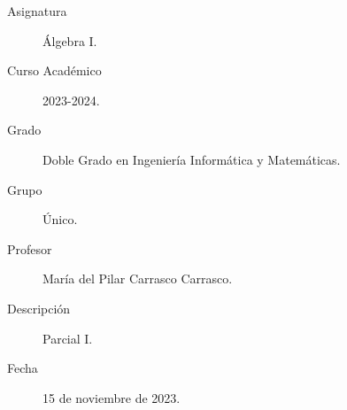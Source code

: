 \documentclass[12pt]{article}
\begin{document}
    \newcommand{\Z}{{\mathbb{Z}}} %
    \newcommand{\Q}{{\mathbb{Q}}} %
    \newcommand{\R}{{\mathbb{R}}} %
    \newcommand{\C}{{\mathbb{C}}} %
    
    
    

    \begin{description}
        \item[Asignatura] Álgebra I.
        \item[Curso Académico] 2023-2024.
        \item[Grado] Doble Grado en Ingeniería Informática y Matemáticas.
        \item[Grupo] Único.
        \item[Profesor] María del Pilar Carrasco Carrasco.
        \item[Descripción] Parcial I.
        \item[Fecha] 15 de noviembre de 2023.
    
    \end{description}
    \newpage


    
\end{document}
